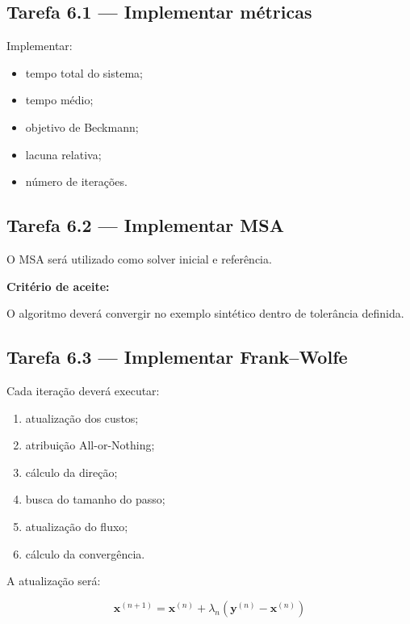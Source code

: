\documentclass[12pt,a4paper]{article}
\begin{document}
\subsection{Tarefa 6.1 --- Implementar métricas}

Implementar:

\begin{itemize}
    \item tempo total do sistema;
    \item tempo médio;
    \item objetivo de Beckmann;
    \item lacuna relativa;
    \item número de iterações.
\end{itemize}

\subsection{Tarefa 6.2 --- Implementar MSA}

O MSA será utilizado como solver inicial e referência.

\textbf{Critério de aceite:}

O algoritmo deverá convergir no exemplo sintético dentro de tolerância
definida.

\subsection{Tarefa 6.3 --- Implementar Frank--Wolfe}

Cada iteração deverá executar:

\begin{enumerate}
    \item atualização dos custos;
    \item atribuição All-or-Nothing;
    \item cálculo da direção;
    \item busca do tamanho do passo;
    \item atualização do fluxo;
    \item cálculo da convergência.
\end{enumerate}

A atualização será:

\begin{equation}
    \mathbf{x}^{(n+1)}
    =
    \mathbf{x}^{(n)}
    +
    \lambda_n
    \left(
        \mathbf{y}^{(n)} - \mathbf{x}^{(n)}
    \right)
\end{equation}
\end{document}

